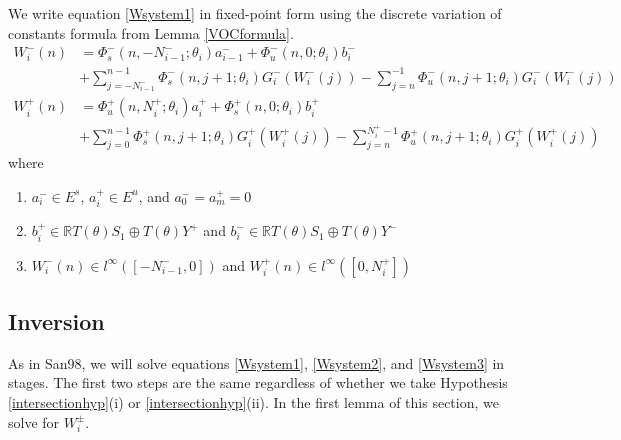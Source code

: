 \documentclass[12pt]{article}
\def\R{{\mathbb R}}
\begin{document}
We write equation \eqref{Wsystem1} in fixed-point form using the discrete variation of constants formula from Lemma \ref{VOCformula}.
\begin{equation}\label{FPeqs1}
\begin{aligned}
W_i^-(n) &= 
\Phi_s^-(n, -N_{i-1}^-; \theta_i) a_{i-1}^- + \Phi_u^-(n, 0; \theta_i) b_i^-  \\
&+ \sum_{j = -N_{i-1}^-}^{n-1} \Phi_s^-(n, j+1; \theta_i) G_i^-(W_i^-(j)) - \sum_{j = n}^{-1} \Phi_u^-(n, j+1; \theta_i) G_i^-(W_i^-(j)) \\
W_i^+(n) &= \Phi_u^+(n, N_i^+; \theta_i) a_i^+ + \Phi_s^+(n, 0; \theta_i) b_i^+ \\
&+ \sum_{j = 0}^{n-1} \Phi_s^+(n, j+1; \theta_i) G_i^+(W_i^+(j)) 
- \sum_{j = n}^{N_i^+-1} \Phi_u^+(n, j+1; \theta_i) G_i^+(W_i^+(j))
\end{aligned}
\end{equation}
where 
\begin{enumerate}
\item $a_i^- \in E^s$, $a_i^+ \in E^u$, and $a_0^- = a_m^+ = 0$
\item $b_i^+ \in \R T(\theta) S_1 \oplus T(\theta) Y^+$ and $b_i^- \in \R T(\theta) S_1 \oplus T(\theta) Y^-$
\item $W_i^-(n) \in l^\infty([-N_{i-1}^-, 0])$ and $W_i^+(n) \in l^\infty([0, N_i^+])$
\end{enumerate}

\subsection{Inversion}

As in San98, we will solve equations \eqref{Wsystem1}, \eqref{Wsystem2}, and \eqref{Wsystem3} in stages. The first two steps are the same regardless of whether we take Hypothesis \ref{intersectionhyp}(i) or \ref{intersectionhyp}(ii). In the first lemma of this section, we solve for $W_i^\pm$.
\end{document}
